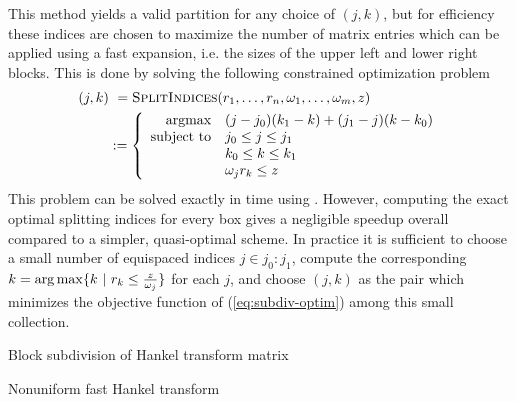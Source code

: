 This method yields a valid partition for any choice of $(j,k)$, but for
efficiency these indices are chosen to maximize the number of matrix entries
which can be applied using a fast expansion, i.e. the sizes of the upper left
and lower right blocks. This is done by solving the following constrained
optimization problem
\begin{align}
    (j,k) 
    &\ = \textsc{SplitIndices}(r_1,\dots,r_n, \omega_1,\dots,\omega_m, z) \\
    &:= \left\{
        \begin{array}{r@{\quad } l}
        \text{argmax} & (j-j_0)(k_1-k) + (j_1-j)(k-k_0)   \\
        \text{subject to} & j_0 \leq j \leq j_1 \\ 
        & k_0 \leq k \leq k_1 \\ 
        & \omega_j r_k \leq z
        \end{array}
    \right. \label{eq:subdiv-optim}
\end{align}
This problem can be solved exactly in  time
using . However, computing the exact optimal splitting indices
for every box gives a negligible speedup overall compared to a simpler,
quasi-optimal scheme. In practice it is sufficient to choose a small number of
equispaced indices $j \in j_0:j_1$, compute the corresponding $k = \operatorname*{arg\,max} \{k \
| \ r_k \leq \frac{z}{\omega_j}\}$ for each $j$, and choose $(j,k)$ as the pair
which minimizes the objective function of (\ref{eq:subdiv-optim}) among this
small collection.

\begin{algorithm}[t]
    \caption{Block subdivision of Hankel transform
    matrix}\label{alg:subdivision}
    
\end{algorithm}

\begin{algorithm}[t]
    \caption{Nonuniform fast Hankel transform}\label{alg:nufht}
    
\end{algorithm}


